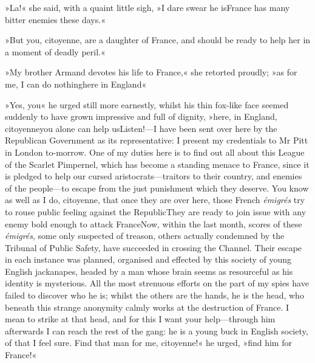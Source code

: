 »La!\textellipsis« she said, with a quaint little sigh, »I dare swear he is\textellipsis \allowbreak  France has many bitter enemies these days.«

»But you, citoyenne, are a daughter of France, and should be ready to help her in a moment of deadly peril.«

»My brother Armand devotes his life to France,« she retorted proudly; »as for me, I can do nothing\textellipsis \allowbreak  here in England\textellipsis«

»Yes, you\textellipsis« he urged still more earnestly, whilst his thin fox-like face seemed suddenly to have grown impressive and full of dignity, »here, in England, citoyenne\textellipsis \allowbreak  you alone can help us\textellipsis \allowbreak  Listen!—I have been sent over here by the Republican Government as its representative: I present my credentials to Mr Pitt in London to-morrow. One of my duties here is to find out all about this League of the Scarlet Pimpernel, which has become a standing menace to France, since it is pledged to help our cursed aristocrats—traitors to their country, and enemies of the people—to escape from the just punishment which they deserve. You know as well as I do, citoyenne, that once they are over here, those French \textit{émigrés} try to rouse public feeling against the Republic\textellipsis \allowbreak  They are ready to join issue with any enemy bold enough to attack France\textellipsis \allowbreak  Now, within the last month, scores of these \textit{émigrés}, some only suspected of treason, others actually condemned by the Tribunal of Public Safety, have succeeded in crossing the Channel. Their escape in each instance was planned, organised and effected by this society of young English jackanapes, headed by a man whose brain seems as resourceful as his identity is mysterious. All the most strenuous efforts on the part of my spies have failed to discover who he is; whilst the others are the hands, he is the head, who beneath this strange anonymity calmly works at the destruction of France. I mean to strike at that head, and for this I want your help—through him afterwards I can reach the rest of the gang: he is a young buck in English society, of that I feel sure. Find that man for me, citoyenne!« he urged, »find him for France!«

